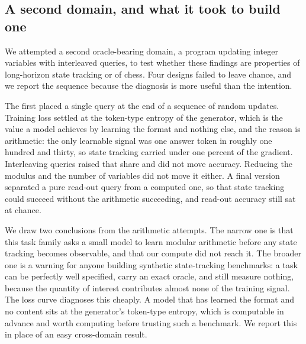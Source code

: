 
\subsection{A second domain, and what it took to build one}
\label{sec:synthfail}

We attempted a second oracle-bearing domain, a program updating integer variables
with interleaved queries, to test whether these findings are properties of
long-horizon state tracking or of chess. Four designs failed to leave chance, and
we report the sequence because the diagnosis is more useful than the intention.

The first placed a single query at the end of a sequence of random updates.
Training loss settled at the token-type entropy of the generator, which is the
value a model achieves by learning the format and nothing else, and the reason is
arithmetic: the only learnable signal was one answer token in roughly one
hundred and thirty, so state tracking carried under one percent of the gradient.
Interleaving queries raised that share and did not move accuracy. Reducing the
modulus and the number of variables did not move it either. A final version
separated a pure read-out query from a computed one, so that state tracking could
succeed without the arithmetic succeeding, and read-out accuracy still sat at
chance.

We draw two conclusions from the arithmetic attempts. The narrow one is that this task
family asks a small model to learn modular arithmetic before any state tracking
becomes observable, and that our compute did not reach it. The broader one is a
warning for anyone building synthetic state-tracking benchmarks: a task can be
perfectly well specified, carry an exact oracle, and still measure nothing,
because the quantity of interest contributes almost none of the training signal.
The loss curve diagnoses this cheaply. A model that has learned the format and no
content sits at the generator's token-type entropy, which is computable in
advance and worth computing before trusting such a benchmark. We report this in
place of an easy cross-domain result.

